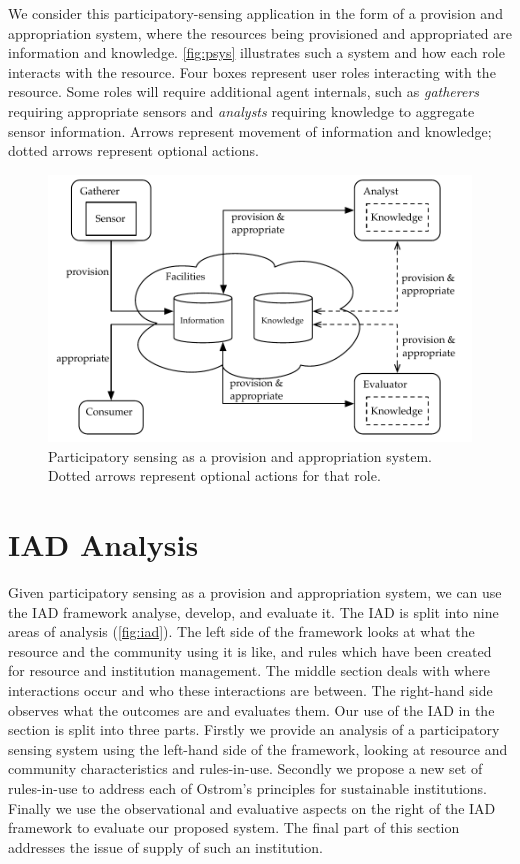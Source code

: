 We consider this participatory-sensing application in the form of a provision and appropriation system, where the resources being provisioned and appropriated are information and knowledge. \autoref{fig:psys} illustrates such a system and how each role interacts with the resource. Four boxes represent user roles interacting with the resource. Some roles will require additional agent internals, such as \emph{gatherers} requiring appropriate sensors and \emph{analysts} requiring knowledge to aggregate sensor information. Arrows represent movement of information and knowledge; dotted arrows represent optional actions.

\begin{figure}
\includegraphics[width=\linewidth]{gfx/Prov_and_app_sys_diag}
\caption[Participatory sensing as a provision and appropriation system]{Participatory sensing as a provision and appropriation system. Dotted arrows represent optional actions for that role.}\label{fig:psys}
\end{figure}

\section{IAD Analysis}

Given participatory sensing as a provision and appropriation system, we can use the \ac{IAD} framework analyse, develop, and evaluate it. 
The \ac{IAD} is split into nine areas of analysis (\autoref{fig:iad}). 
The left side of the framework looks at what the resource and the community using it is like, and rules which have been created for resource and institution management. 
The middle section deals with where interactions occur and who these interactions are between. 
The right-hand side observes what the outcomes are and evaluates them.
Our use of the \ac{IAD} in the section is split into three parts.
Firstly we provide an analysis of a participatory sensing system using the left-hand side of the framework, looking at resource and community characteristics and rules-in-use. 
Secondly we propose a new set of rules-in-use to address each of Ostrom's principles for sustainable institutions. 
Finally we use the observational and evaluative aspects on the right of the \ac{IAD} framework to evaluate our proposed system.
The final part of this section addresses the issue of supply of such an institution.

